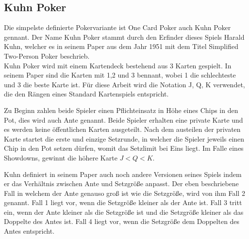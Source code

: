 \subsection{Kuhn Poker}
Die simpelste definierte Pokervariante ist One Card Poker auch Kuhn Poker gennant.
Der Name Kuhn Poker stammt durch den Erfinder dieses Spiels Harald Kuhn, welcher es in seinem Paper aus dem Jahr 1951 mit dem Titel \grqq Simplified Two-Person Poker \glqq beschrieb. \\
Kuhn Poker wird mit einem Kartendeck bestehend aus 3 Karten gespielt.
In seinem Paper sind die Karten mit 1,2 und 3 bennant, wobei 1 die schlechteste und 3 die beste Karte ist.
Für diese Arbeit wird die Notation J, Q, K verwendet, die den Rängen eines Standard Kartenspiels entspricht.

Zu Beginn zahlen beide Spieler einen Pflichteinsatz in Höhe eines Chips in den Pot, dies wird auch Ante genannt. 
Beide Spieler erhalten eine private Karte und es werden keine öffentlichen Karten ausgeteilt.
Nach dem austeilen der privaten Karte startet die erste und einzige Setzrunde, in welcher die Spieler jeweils einen Chip in den Pot setzen dürfen, womit das Setzlimit bei Eins liegt.
Im Falle eines Showdowns, gewinnt die höhere Karte $J < Q < K$.

Kuhn definiert in seinem Paper auch noch andere Versionen seines Spiels indem er das Verhältnis zwischen Ante und Setzgröße anpasst.
Der eben beschriebene Fall in welchem der Ante genauso groß ist wie die Setzgröße, wird von ihm Fall 2 genannt.
Fall 1 liegt vor, wenn die Setzgröße kleiner als der Ante ist.
Fall 3 tritt ein, wenn der Ante kleiner als die Setzgröße ist und die Setzgröße kleiner als das Doppelte des Antes ist.
Fall 4 liegt vor, wenn die Setzgröße dem Doppelten des Antes entspricht.
\cite{kuhn1951simplified}